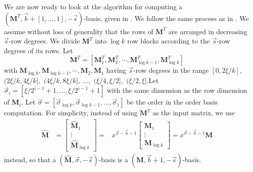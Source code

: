 \begin{comment}
We know that $\mathbf{P}$ contains a $(\mathbf{M}^{T},-\vec{s})$-kernel
basis since any $(\mathbf{M}^{T},-\vec{s})$-kernel basis has $-\vec{s}$-column
degrees bounded by that of $\mathbf{F}^{rT}$, which is the same as
that of $\mathbf{F}^{T}$ and no more than $0$.\end{proof}
\end{comment}


We are now ready to look at the algorithm for computing a $\left(\mathbf{M}^{T},\vec{b}+\left[1,\dots,1\right],-\vec{s}\right)$-basis,
given in .  We follow the same
process as in . We assume without
loss of generality that the rows of $\mathbf{M}^{T}$ are arranged
in decreasing $\vec{s}$-row degrees. We divide $\mathbf{M}^{T}$
into $\log k$ row blocks according to the $\vec{s}$-row degrees
of its rows. Let 
\[
\mathbf{M}^{T}=\left[\mathbf{M}_{1}^{T},\mathbf{M}_{2}^{T},\cdots,\mathbf{M}_{\log k-1}^{T},\mathbf{M}_{\log k}^{T}\right]
\]
 with $\mathbf{M}_{\log k},\mathbf{M}_{\log k-1},\cdots,\mathbf{M}_{2},\mathbf{M}_{1}$
having $\vec{s}$-row degrees in the range $\left[0,2\xi/k\right]$,
$(2\xi/k,4\xi/k],$ $(4\xi/k,8\xi/k],\ ...,$ $(\xi/4,\xi/2],$ $(\xi/2,\xi].$Let
$\vec{\sigma}_{i}=\left[\xi/2^{i-1}+1,\dots,\xi/2^{i-1}+1\right]$
with the same dimension as the row dimension of $\mathbf{M}_{i}$.
Let $\vec{\sigma}=\left[\vec{\sigma}_{\log k},\vec{\sigma}_{\log k-1},\dots,\vec{\sigma}_{1}\right]$
be the order in the order basis computation. For simplicity, instead
of using $\mathbf{M}^{T}$ as the input matrix, we use 
\begin{eqnarray*}
\hat{\mathbf{M}} & =\begin{bmatrix}\hat{\mathbf{M}}_{1}\\
\vdots\\
\hat{\mathbf{M}}_{\log k}
\end{bmatrix}= & x^{\vec{\sigma}-\vec{b}-1}\begin{bmatrix}\mathbf{M}_{1}\\
\vdots\\
\mathbf{M}_{\log k}
\end{bmatrix}=x^{\vec{\sigma}-\vec{b}-1}\mathbf{M}
\end{eqnarray*}
 instead, so that a $\left(\hat{\mathbf{M}},\vec{\sigma},-\vec{s}\right)$-basis
is a $\left(\mathbf{M},\vec{b}+1,-\vec{s}\right)$-basis.



